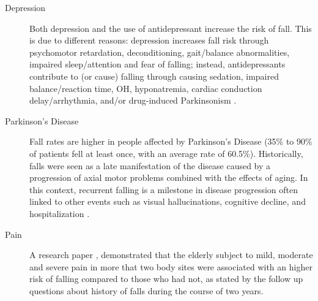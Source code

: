 \begin{description}
   \item[Depression] Both depression and the use of antidepressant increase the risk of fall. This is due to different reasons: depression increases fall risk through psychomotor retardation, deconditioning, gait/balance abnormalities, impaired sleep/attention and fear of falling; instead, antidepressants contribute to (or cause) falling through causing sedation, impaired balance/reaction time, OH, hyponatremia, cardiac conduction delay/arrhythmia, and/or drug-induced Parkinsonism \cite{DepressionRisk}.
   \item[Parkinson's Disease] Fall rates are higher in people affected by Parkinson's Disease (35\% to 90\% of patients fell at least once, with an average rate of 60.5\%). Historically, falls were seen as a late manifestation of the disease caused by a progression of axial motor problems combined with the effects of aging. In this context, recurrent falling is a milestone in disease progression often linked to other events such as visual hallucinations, cognitive decline, and hospitalization \cite{ParkinsonRisk}.
   \item[Pain] A research paper \cite{PainRisk}, demonstrated that the elderly subject to mild, moderate and severe pain in more that two body sites were associated with an higher risk of falling compared to those who had not, as stated by the follow up questions about history of falls during the course of two years.
\end{description}

